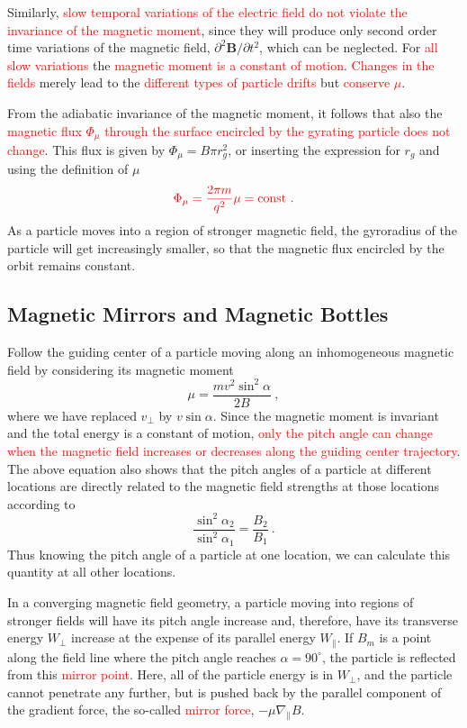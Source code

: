 \documentclass[12pt,a4paper]{article}
\renewcommand{\vec}[1]{\boldsymbol{#1}}
\begin{document}
Similarly, \textcolor{red}{slow temporal variations of the electric field do not violate the invariance of the magnetic moment}, since they will produce only second order time variations of the magnetic field, $\partial^2 \vec{B}/\partial t^2$, which can be neglected. For \textcolor{red}{all slow variations} the \textcolor{red}{magnetic moment is a constant of motion}. \textcolor{red}{Changes in the fields} merely lead to the \textcolor{red}{different types of particle drifts} but \textcolor{red}{conserve $\mu$}.

From the adiabatic invariance of the magnetic moment, it follows that also the \textcolor{red}{magnetic flux $\Phi_\mu$ through the surface encircled by the gyrating particle does not change}. This flux is given by $\Phi_\mu = B \pi r^2_g$, or inserting the expression for $r_g$  and using the definition of $\mu$
\begin{equation}
\color{red} \Phi_\mu =  \dfrac{2\pi m}{q^2} \mu = \text{const} ~.
\end{equation}
As a particle moves into a region of stronger magnetic field, the gyroradius of the particle will get increasingly smaller, so that the magnetic flux encircled by the orbit remains constant.


\subsection{Magnetic Mirrors and Magnetic Bottles}
\cite{1996bspp.book.....B} Follow the guiding center of a particle moving along an inhomogeneous magnetic field by considering its magnetic moment
\begin{equation}
\mu = \dfrac{mv^2 \sin^2 \alpha}{2B} ~,
\end{equation}
where we have replaced $v_\perp$ by $v\sin \alpha$. Since the magnetic moment is invariant and the total energy is a constant of motion, \textcolor{red}{only the pitch angle can change when the magnetic field increases or decreases along the guiding center trajectory}. The above equation also shows that the pitch angles of a particle at different locations are directly related to the magnetic field strengths at those locations
according to
\begin{equation}
\dfrac{\sin^2 \alpha_2}{\sin^2 \alpha_1} = \dfrac{B_2}{B_1} ~.
\end{equation}
Thus knowing the pitch angle of a particle at one location, we can calculate this quantity at all other locations.

In a converging magnetic field geometry, a particle moving into regions of stronger fields will have its pitch angle increase and, therefore, have its transverse energy $W_\perp$ increase at the expense of its parallel energy $W_\parallel$. If $B_m$ is a point along the field line
where the pitch angle reaches $\alpha = 90^\circ$, the particle is reflected from this \textcolor{red}{mirror point}. Here, all of the particle energy is in $W_\perp$, and the particle cannot penetrate any further, but is pushed back by the parallel component of the gradient force, the so-called \textcolor{red}{mirror force}, $-\mu \nabla_\parallel B$.
\end{document}
